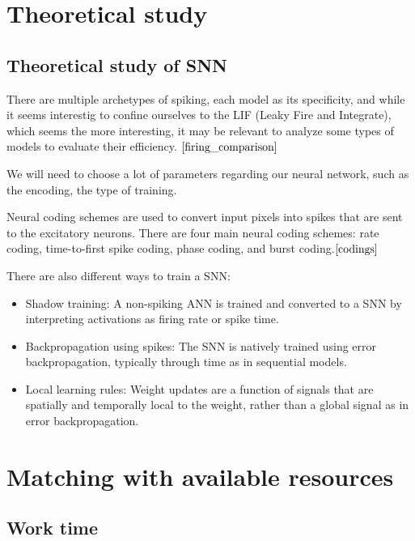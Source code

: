 \documentclass[11pt]{article}
\begin{document}
\section{Theoretical study}
\subsection{Theoretical study of SNN}

There are multiple archetypes of spiking, each model as its specificity, and while it seems interestig to confine ourselves to the LIF (Leaky Fire and Integrate), which seems the more interesting, it may be relevant to analyze some types of models to evaluate their efficiency. ${\cite{firing_comparison}}$

We will need to choose a lot of parameters regarding our neural network, such as the encoding, the type of training.

Neural coding schemes are used to convert input pixels into spikes that are sent to the excitatory neurons. There are four main neural coding schemes: rate coding, time-to-first spike coding, phase coding, and burst coding.${\cite{codings}}$

There are also different ways to train a SNN:
\begin{itemize}
  \item Shadow training: A non-spiking ANN is trained and converted to a SNN by interpreting activations as firing rate or spike time.
  \item Backpropagation using spikes: The SNN is natively trained using error backpropagation, typically through time as in sequential models.
  \item Local learning rules: Weight updates are a function of signals that are spatially and temporally local to the weight, rather than a global signal as in error backpropagation.
\end{itemize}

\pagebreak
\section{Matching with available resources}
\subsection{Work time}
\end{document}
